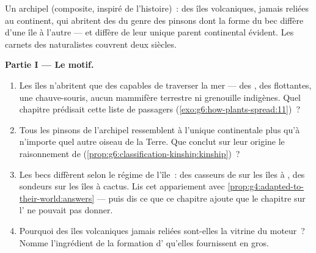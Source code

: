 \begin{problem}\label{pb:g9:how-species-change:1}
Un archipel (composite, inspiré de l'histoire)~: des îles
volcaniques, jamais reliées au continent, qui abritent des
 du genre des pinsons dont la forme du bec diffère
d'une île à l'autre --- et diffère de leur unique parent
continental évident. Les carnets des naturalistes couvrent
deux siècles.

\medskip\noindent\textbf{Partie I --- Le motif.}
\begin{enumerate}
  \item Les îles n'abritent que des  capables de
        traverser la mer --- des , des 
        flottantes, une chauve-souris, aucun mammifère
        terrestre ni grenouille indigènes. Quel chapitre
        prédisait cette liste de passagers
        (\cref{exo:g6:how-plants-spread:11})~?
  \item Tous les pinsons de l'archipel ressemblent à
        l'unique  continentale plus qu'à n'importe
        quel autre oiseau de la Terre. Que conclut sur leur
        origine le raisonnement de 
        (\cref{prop:g6:classification-kinship:kinship})~?
  \item Les becs diffèrent selon le régime de l'île~: des
        casseurs de  sur les îles à , des
        sondeurs sur les îles à cactus. Lis cet
        appariement avec
        \cref{prop:g4:adapted-to-their-world:answers} ---
        puis dis ce que ce chapitre ajoute que le chapitre
        sur l' ne pouvait pas donner.
  \item Pourquoi des îles volcaniques jamais reliées
        sont-elles la vitrine du moteur~? Nomme
        l'ingrédient de la formation d' qu'elles
        fournissent en gros.
\end{enumerate}


\end{problem}
